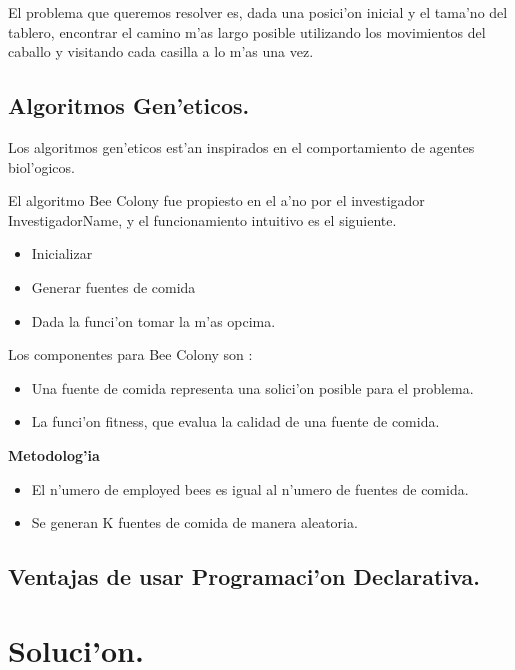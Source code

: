 \documentclass[12pt]{article}
\begin{document}
    El problema que queremos resolver es, dada una posici'on inicial y el tama'no del tablero,
    encontrar el camino m'as largo posible utilizando los movimientos del caballo
    y visitando cada casilla a lo m'as una vez.


    \subsection{Algoritmos Gen'eticos.}
    Los algoritmos gen'eticos est'an inspirados en el comportamiento de
    agentes biol'ogicos.

    El algoritmo Bee Colony fue propiesto en el a'no por el investigador InvestigadorName,
    y el funcionamiento intuitivo es el siguiente.

    \begin{itemize}
        \item Inicializar
        \item Generar fuentes de comida
        \item Dada la funci'on tomar la m'as opcima.
    \end{itemize}
    \vspace{4mm}

    Los componentes para Bee Colony son \cite{anan} :
    \begin{itemize}
        \item Una fuente de comida representa una solici'on posible para el problema.
        \item La funci'on fitness, que evalua la calidad de una fuente de comida.
    \end{itemize}

    \textbf{Metodolog'ia}
    \begin{itemize}
        \item El n'umero de employed bees es igual al n'umero de fuentes de comida.
        \item Se generan K fuentes de comida de manera aleatoria.
    \end{itemize}


    \subsection{Ventajas de usar Programaci'on Declarativa.}

    \section{Soluci'on.}
\end{document}
